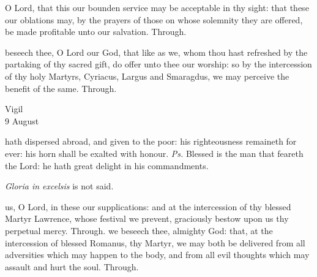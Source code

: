 
\secret
{} O Lord, that this our bounden service may be acceptable in thy sight: that these our oblations may, by the prayers of those on whose solemnity they are offered, be made profitable unto our salvation. Through.


\postcommunion
{} beseech thee, O Lord our God, that like as we, whom thou hast refreshed by the partaking of thy sacred gift, do offer unto thee our worship: so by the intercession of thy holy Martyrs, Cyriacus, Largus and Smaragdus, we may perceive the benefit of the same. Through.

\begin{inhead}
    {Vigil\\
9 August}
\end{inhead}

\introit
{} hath dispersed abroad, and given to the poor: his righteousness remaineth for ever: his horn shall be exalted with honour. \textit{Ps.} Blessed is the man that feareth the Lord: he hath great delight in his commandments.
\begin{rubric}
	\emph{Gloria in excelsis} is not said.
\end{rubric}

\collect
{} us, O Lord, in these our supplications: and at the intercession of thy blessed Martyr Lawrence, whose festival we prevent, graciously bestow upon us thy perpetual mercy. Through.
 we beseech thee, almighty God: that, at the intercession of blessed Romanus, thy Martyr, we may both be delivered from all adversities which may happen to the body, and from all evil thoughts which may assault and hurt the soul. Through.

